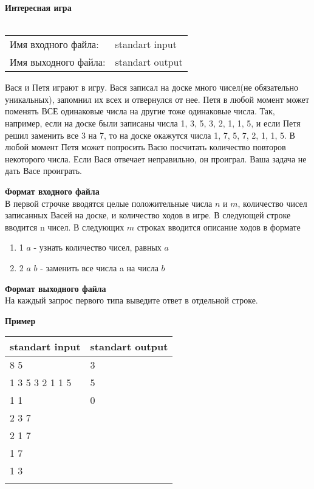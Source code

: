\documentclass[10pt, a4paper]{article}
\begin{document}
	{\selectfont
		\noindent\LARGE\textbf{Интересная игра}\\\\
		\normalsize
		\begin{tabular}{ll}
			\indent Имя входного файла: & standart input\\
			\indent Имя выходного файла: & standart output\\
		\end{tabular}
		
		\noindent Вася и Петя играют в игру. Вася записал на доске много чисел(не обязательно уникальных), запомнил их всех и отвернулся от нее. Петя в любой момент может поменять ВСЕ одинаковые числа на другие тоже одинаковые числа. Так, например, если на доске были записаны числа 1, 3, 5, 3, 2, 1, 1, 5, и если Петя решил заменить все 3 на 7, то на доске окажутся числа 1, 7, 5, 7, 2, 1, 1, 5. В любой момент Петя может попросить Васю посчитать количество повторов некоторого числа. Если Вася отвечает неправильно, он проиграл. Ваша задача не дать Васе проиграть.
		
		\noindent\large\textbf{Формат входного файла}\\
		\normalsize В первой строчке вводятся целые положительные числа $n$ и $m$, количество чисел записанных Васей на доске, и количество ходов в игре. В следующей строке вводится n чисел. В следующих $m$ строках вводится описание ходов в формате 
		\begin{enumerate}
				\item 1 $a$ - узнать количество чисел, равных $a$
				\item 2 $a$ $b$ - заменить все числа a на числа $b$
		\end{enumerate}
		
		\noindent\large\textbf{Формат выходного файла}\\\normalsize На каждый запрос первого типа выведите ответ в отдельной строке. 
		
		\noindent\large\textbf{Пример}\normalsize
		
		\noindent\begin{tabular}{|p{5,5cm}|p{}|}
			\hline
			\multicolumn{1}{|c|}{standart input} & \multicolumn{1}{c|}{standart output}\\\hline
			8 5 & 3 \\
			1 3 5 3 2 1 1 5 & 5 \\
			1 1 & 0\\
			2 3 7 & \\
			2 1 7 & \\
			1 7 & \\
			1 3 & \\
			& \\\hline
		\end{tabular}
		
	}
	
\end{document}
